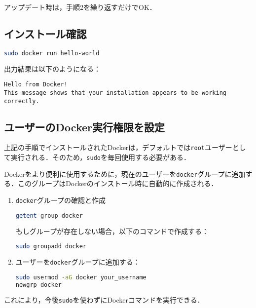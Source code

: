 アップデート時は，手順2を繰り返すだけでOK．
\subsection{インストール確認}
\begin{lstlisting}[language=bash]
sudo docker run hello-world
\end{lstlisting}

出力結果は以下のようになる：
\begin{lstlisting}
Hello from Docker!
This message shows that your installation appears to be working correctly.
\end{lstlisting}
\subsection{ユーザーのDocker実行権限を設定}
上記の手順でインストールされたDockerは，デフォルトでは\texttt{root}ユーザーとして実行される．そのため，\texttt{sudo}を毎回使用する必要がある．

Dockerをより便利に使用するために，現在のユーザーを\texttt{docker}グループに追加する．このグループはDockerのインストール時に自動的に作成される．
\begin{enumerate}
    \item \texttt{docker}グループの確認と作成
\begin{lstlisting}[language=bash]
getent group docker
\end{lstlisting}
もしグループが存在しない場合，以下のコマンドで作成する：
\begin{lstlisting}[language=bash]
sudo groupadd docker
\end{lstlisting}
    \item ユーザーを\texttt{docker}グループに追加する：
\begin{lstlisting}[language=bash]
sudo usermod -aG docker your_username
newgrp docker
\end{lstlisting}
\end{enumerate}

これにより，今後\texttt{sudo}を使わずにDockerコマンドを実行できる．